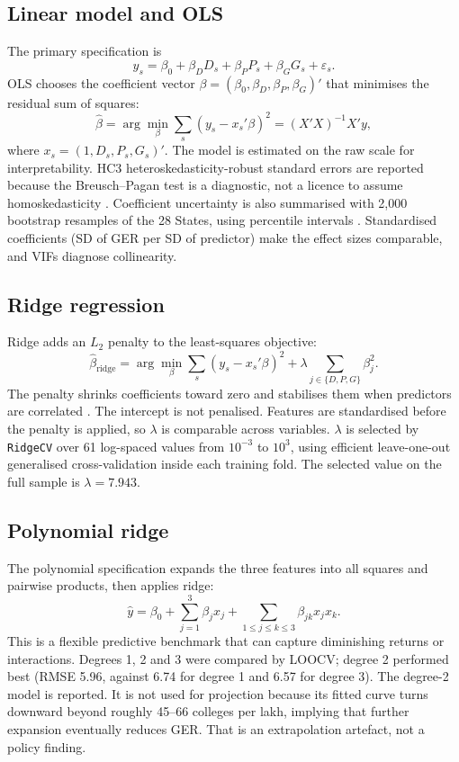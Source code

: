\subsection{Linear model and OLS}

The primary specification is
\[
y_s = \beta_0 + \beta_D D_s + \beta_P P_s + \beta_G G_s + \varepsilon_s.
\]
OLS chooses the coefficient vector \(\beta = (\beta_0, \beta_D, \beta_P, \beta_G)'\) that minimises the residual sum of squares:
\[
\hat{\beta} = \arg\min_{\beta} \sum_s \left(y_s - x_s'\beta\right)^2 = (X'X)^{-1}X'y,
\]
where \(x_s = (1, D_s, P_s, G_s)'\). The model is estimated on the raw scale for interpretability. HC3 hetero\-skedasticity-robust standard errors are reported because the Breusch--Pagan test is a diagnostic, not a licence to assume homoskedasticity \cite{white1980,mackinnon1985}. Coefficient uncertainty is also summarised with 2,000 bootstrap resamples of the 28 States, using percentile intervals \cite{efron1993}. Standardised coefficients (SD of GER per SD of predictor) make the effect sizes comparable, and VIFs diagnose collinearity.

\subsection{Ridge regression}

Ridge adds an \(L_2\) penalty to the least-squares objective:
\[
\hat{\beta}_{\text{ridge}} = \arg\min_{\beta} \sum_s \left(y_s - x_s'\beta\right)^2 + \lambda \sum_{j \in \{D,P,G\}} \beta_j^2.
\]
The penalty shrinks coefficients toward zero and stabilises them when predictors are correlated \cite{hoerl1970}. The intercept is not penalised. Features are standardised before the penalty is applied, so \(\lambda\) is comparable across variables. \(\lambda\) is selected by \texttt{RidgeCV} over 61 log-spaced values from \(10^{-3}\) to \(10^{3}\), using efficient leave-one-out generalised cross-validation inside each training fold. The selected value on the full sample is \(\lambda = 7.943\).

\subsection{Polynomial ridge}

The polynomial specification expands the three features into all squares and pairwise products, then applies ridge:
\[
\hat{y} = \beta_0 + \sum_{j=1}^3 \beta_j x_j + \sum_{1 \le j \le k \le 3} \beta_{jk} x_j x_k.
\]
This is a flexible predictive benchmark that can capture diminishing returns or interactions. Degrees 1, 2 and 3 were compared by LOOCV; degree 2 performed best (RMSE 5.96, against 6.74 for degree 1 and 6.57 for degree 3). The degree-2 model is reported. It is not used for projection because its fitted curve turns downward beyond roughly 45--66 colleges per lakh, implying that further expansion eventually reduces GER. That is an extrapolation artefact, not a policy finding.

